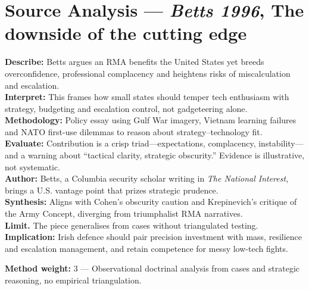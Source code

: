 \section*{Source Analysis — \textit{Betts 1996}, The downside of the cutting edge}
\textbf{Describe:} Betts argues an RMA benefits the United States yet breeds overconfidence, professional complacency and heightens risks of miscalculation and escalation.\\
\textbf{Interpret:} This frames how small states should temper tech enthusiasm with strategy, budgeting and escalation control, not gadgeteering alone.\\
\textbf{Methodology:} Policy essay using Gulf War imagery, Vietnam learning failures and NATO first-use dilemmas to reason about strategy–technology fit.\\
\textbf{Evaluate:} Contribution is a crisp triad—expectations, complacency, instability—and a warning about “tactical clarity, strategic obscurity.” Evidence is illustrative, not systematic.\\
\textbf{Author:} Betts, a Columbia security scholar writing in \textit{The National Interest}, brings a U.S. vantage point that prizes strategic prudence.\\
\textbf{Synthesis:} Aligns with Cohen’s obscurity caution and Krepinevich’s critique of the Army Concept, diverging from triumphalist RMA narratives.\\
\textbf{Limit.} The piece generalises from cases without triangulated testing.\\
\textbf{Implication:} Irish defence should pair precision investment with mass, resilience and escalation management, and retain competence for messy low-tech fights.

\textbf{Method weight:} 3 — Observational doctrinal analysis from cases and strategic reasoning, no empirical triangulation.


